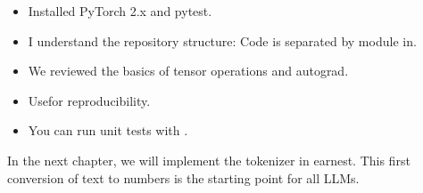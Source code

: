 \begin{itemize}
\item Installed PyTorch 2.x and pytest.
\item I understand the repository structure: Code is separated by module in.
\item We reviewed the basics of tensor operations and autograd.
\item Usefor reproducibility.
\item You can run unit tests with .
\end{itemize}

In the next chapter, we will implement the tokenizer in earnest. This first conversion of text to numbers is the starting point for all LLMs.
